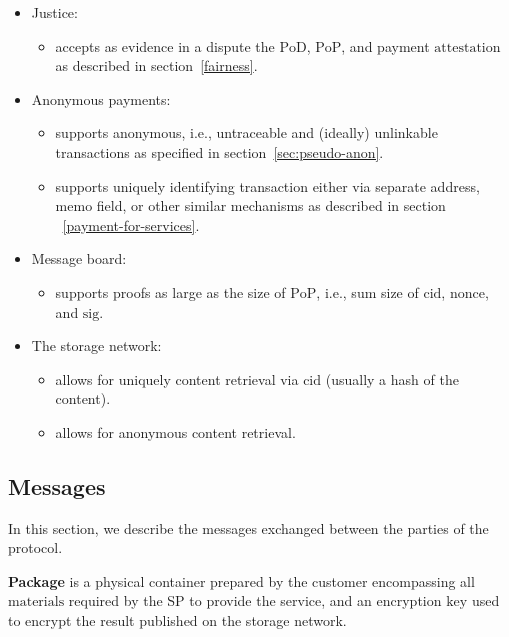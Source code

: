 \documentclass{ieeeaccess}
\begin{document}
\begin{itemize}
\item Justice:
    \begin{itemize}
        \item accepts as evidence in a dispute the $\mathrm{PoD}$, $\mathrm{PoP}$, and payment $\mathrm{attestation}$ as described in section~\ref{fairness}.
    \end{itemize}

\item Anonymous payments:
    \begin{itemize}
        \item supports anonymous, i.e., untraceable and (ideally) unlinkable transactions as specified in section~\ref{sec:pseudo-anon}.
        \item supports uniquely identifying transaction either via separate address, memo field, or other similar mechanisms as described in section ~\ref{payment-for-services}. 
    \end{itemize}

\item Message board:
    \begin{itemize}
        \item supports proofs as large as the size of $\mathrm{PoP}$, i.e., sum size of $\mathrm{cid}$, $\mathrm{nonce}$, and $\mathrm{sig}$.
    \end{itemize}

\item The storage network:
    \begin{itemize}
        \item allows for uniquely content retrieval via $\mathrm{cid}$ (usually a hash of the content).
        \item allows for anonymous content retrieval.
    \end{itemize}
\end{itemize}

\subsection{Messages}\label{messages}
In this section, we describe the messages exchanged between the parties of the protocol.

\vspace{5mm}

\noindent \textbf
{Package}\label{package} is a physical container prepared by the customer encompassing all $\mathrm{materials}$ required by the SP to provide the service, and an encryption $\mathrm{key}$ used to encrypt the result published on the storage network.
\end{document}
